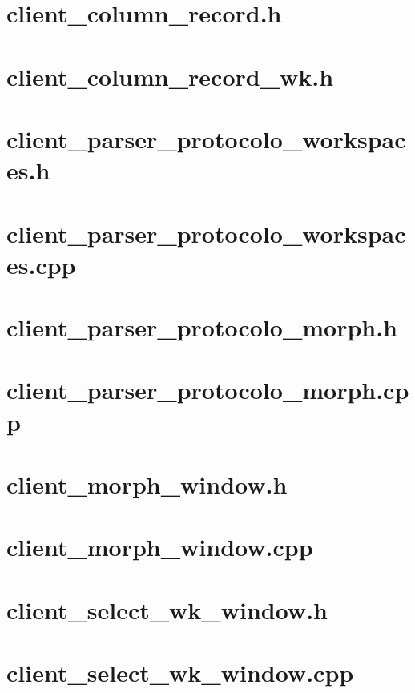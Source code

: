 \documentclass{article}
\begin{document}
\section{ client\_column\_record.h}

\newpage
\section{ client\_column\_record\_wk.h }

\newpage
\section{ client\_parser\_protocolo\_workspaces.h }

\newpage
\section{ client\_parser\_protocolo\_workspaces.cpp }

\newpage
\section{ client\_parser\_protocolo\_morph.h }

\newpage
\section{ client\_parser\_protocolo\_morph.cpp }

\newpage
\section{ client\_morph\_window.h }

\newpage
\section{ client\_morph\_window.cpp }

\newpage
\section{ client\_select\_wk\_window.h }

\newpage
\section{ client\_select\_wk\_window.cpp }

\newpage
\end{document}
